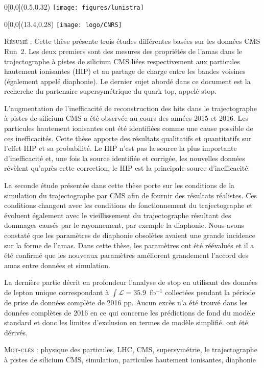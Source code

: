\begin{textblock}{0}[0,0](0.5,0.32)
{
    \setlength{\fboxsep}{0.7pt}
    \setlength{\fboxrule}{1pt}
    \texttt{[image: figures/lunistra]}
}
\end{textblock}
\begin{textblock}{0}[0,0](13.4,0.28)
{
    \setlength{\fboxsep}{0.7pt}
    \setlength{\fboxrule}{1pt}
    \texttt{[image: logo/CNRS]}
}
\end{textblock}
    \vspace*{-0.5cm}
\small
\begin{framed}
    \vspace*{-0.3cm}
\textsc{Résumé} : Cette thèse présente trois études différentes basées sur les données CMS Run~2. Les deux premiers sont des mesures des propriétés de l'amas dans le trajectographe  à pistes de silicium CMS liées respectivement aux particules hautement ionisantes (HIP) et au partage de charge entre les bandes voisines (également appelé diaphonie). Le dernier sujet abordé dans ce document est la recherche du partenaire supersymétrique du quark top, appelé stop.

L'augmentation de l'inefficacité de reconstruction des hits dans le trajectographe  à pistes de silicium CMS a été observée au cours des années 2015 et 2016. Les particules hautement ionisantes ont été identifiées comme une cause possible de ces inefficacités. Cette thèse apporte des résultats qualitatifs et quantitatifs sur l'effet HIP et sa probabilité. Le HIP n’est pas la source la plus importante d’inefficacité et, une fois la source identifiée et corrigée, les nouvelles données révèlent qu’après cette correction, le HIP est la principale source d’inefficacité.

La seconde étude présentée dans cette thèse porte sur les conditions de la simulation du trajectographe par CMS afin de fournir des résultats réalistes. Ces conditions changent avec les conditions de fonctionnement du trajectographe et évoluent également avec le vieillissement du trajectographe résultant des dommages causés par le rayonnement, par exemple la diaphonie. Nous avons constaté que les paramètres de diaphonie obsolètes avaient une grande incidence sur la forme de l'amas. Dans cette thèse, les paramètres ont été réévalués et il a été confirmé que les nouveaux paramètres améliorent grandement l’accord des amas entre données et simulation.

La dernière partie décrit en profondeur l'analyse de stop en utilisant des données de lepton unique correspondant à $ \int{\mathcal{L}} = 35.9 $~fb$^{-1} $ collectées pendant la période de prise de données complète de 2016 pp. Aucun excès n'a été trouvé dans les données complètes de 2016  en ce qui concerne les prédictions de fond du modèle standard et donc les limites d'exclusion en termes de modèle simplifié. ont été dérivés.

    \textsc{Mot-clés} : physique des particules, LHC, CMS, supersymétrie, le trajectographe  à pistes de silicium CMS, simulation, particules hautement ionisantes, diaphonie
\end{framed}
